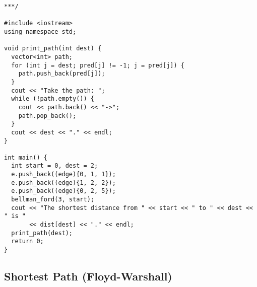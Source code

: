 \begin{lstlisting}
***/

#include <iostream>
using namespace std;

void print_path(int dest) {
  vector<int> path;
  for (int j = dest; pred[j] != -1; j = pred[j]) {
    path.push_back(pred[j]);
  }
  cout << "Take the path: ";
  while (!path.empty()) {
    cout << path.back() << "->";
    path.pop_back();
  }
  cout << dest << "." << endl;
}

int main() {
  int start = 0, dest = 2;
  e.push_back((edge){0, 1, 1});
  e.push_back((edge){1, 2, 2});
  e.push_back((edge){0, 2, 5});
  bellman_ford(3, start);
  cout << "The shortest distance from " << start << " to " << dest << " is "
       << dist[dest] << "." << endl;
  print_path(dest);
  return 0;
}
\end{lstlisting}
\subsection{Shortest Path (Floyd-Warshall)}
